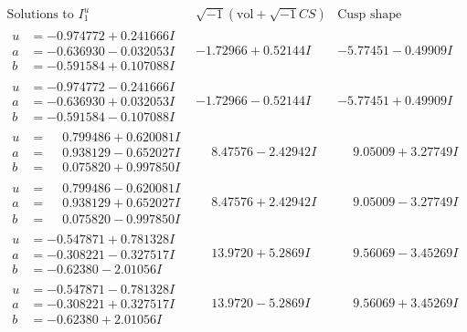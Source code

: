 \documentclass[1p]{elsarticle_modified}
\theoremstyle{definition}
\newcommand{\I}{\sqrt{-1}}
\begin{document}
$$\begin{array}{c|c|c}  
\text{Solutions to }I^u_{1}& \I (\text{vol} + \sqrt{-1}CS) & \text{Cusp shape}\\
 \hline 
\begin{aligned}
u &= -0.974772 + 0.241666 I \\
a &= -0.636930 - 0.032053 I \\
b &= -0.591584 + 0.107088 I\end{aligned}
 & -1.72966 + 0.52144 I & -5.77451 - 0.49909 I \\ \hline\begin{aligned}
u &= -0.974772 - 0.241666 I \\
a &= -0.636930 + 0.032053 I \\
b &= -0.591584 - 0.107088 I\end{aligned}
 & -1.72966 - 0.52144 I & -5.77451 + 0.49909 I \\ \hline\begin{aligned}
u &= \phantom{-}0.799486 + 0.620081 I \\
a &= \phantom{-}0.938129 - 0.652027 I \\
b &= \phantom{-}0.075820 + 0.997850 I\end{aligned}
 & \phantom{-}8.47576 - 2.42942 I & \phantom{-}9.05009 + 3.27749 I \\ \hline\begin{aligned}
u &= \phantom{-}0.799486 - 0.620081 I \\
a &= \phantom{-}0.938129 + 0.652027 I \\
b &= \phantom{-}0.075820 - 0.997850 I\end{aligned}
 & \phantom{-}8.47576 + 2.42942 I & \phantom{-}9.05009 - 3.27749 I \\ \hline\begin{aligned}
u &= -0.547871 + 0.781328 I \\
a &= -0.308221 - 0.327517 I \\
b &= -0.62380 - 2.01056 I\end{aligned}
 & \phantom{-}13.9720 + 5.2869 I & \phantom{-}9.56069 - 3.45269 I \\ \hline\begin{aligned}
u &= -0.547871 - 0.781328 I \\
a &= -0.308221 + 0.327517 I \\
b &= -0.62380 + 2.01056 I\end{aligned}
 & \phantom{-}13.9720 - 5.2869 I & \phantom{-}9.56069 + 3.45269 I \\ \hline\begin{aligned}

\end{aligned}
\end{array}$$
\end{document}
